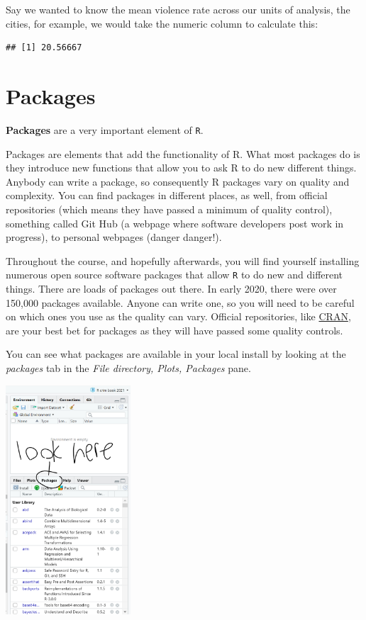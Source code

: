 \documentclass[
]{book}
\newenvironment{Shaded}{\begin{snugshade}}{\end{snugshade}}
\newcommand{\FunctionTok}[1]{\textcolor[rgb]{0.00,0.00,0.00}{#1}}
\newcommand{\NormalTok}[1]{#1}
\newcommand{\SpecialCharTok}[1]{\textcolor[rgb]{0.00,0.00,0.00}{#1}}
\begin{document}
Say we wanted to know the mean violence rate across our units of analysis, the cities, for example, we would take the numeric column to calculate this:

\begin{Shaded}
\end{Shaded}

\begin{verbatim}
## [1] 20.56667
\end{verbatim}

\hypertarget{packages}{%
\section{Packages}\label{packages}}

\textbf{Packages} are a very important element of \texttt{R}.

Packages are elements that add the functionality of R. What most packages do is they introduce new functions that allow you to ask R to do new different things. Anybody can write a package, so consequently R packages vary on quality and complexity. You can find packages in different places, as well, from official repositories (which means they have passed a minimum of quality control), something called Git Hub (a webpage where software developers post work in progress), to personal webpages (danger danger!).

Throughout the course, and hopefully afterwards, you will find yourself installing numerous open source software packages that allow \texttt{R} to do new and different things. There are loads of packages out there. In early 2020, there were over 150,000 packages available. Anyone can write one, so you will need to be careful on which ones you use as the quality can vary. Official repositories, like \href{https://cran.r-project.org/}{CRAN}, are your best bet for packages as they will have passed some quality controls.

You can see what packages are available in your local install by looking at the \emph{packages} tab in the \emph{File directory, Plots, Packages} pane.

\includegraphics[width=0.35\textwidth,height=\textheight]{img/packages.png}
\end{document}

